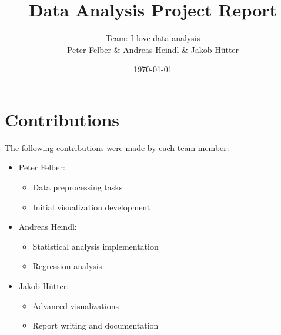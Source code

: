 \documentclass[10pt]{article}
\title{Data Analysis Project Report}
\author{
  Team: I love data analysis\\ 
  Peter Felber \& Andreas Heindl \& Jakob Hütter
}
\date{\today}
\begin{document}
\maketitle

\begin{center}
\end{center}

\section{Contributions}
The following contributions were made by each team member:
\begin{itemize}
    \item Peter Felber:
    \begin{itemize}
        \item Data preprocessing tasks
        \item Initial visualization development
    \end{itemize}
    \item Andreas Heindl:
    \begin{itemize}
        \item Statistical analysis implementation
        \item Regression analysis
    \end{itemize}
    \item Jakob Hütter:
    \begin{itemize}
        \item Advanced visualizations
        \item Report writing and documentation
    \end{itemize}
\end{itemize}
\end{document}
